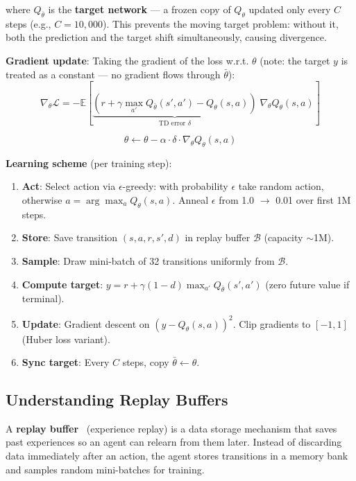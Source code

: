 where $Q_{\bar{\theta}}$ is the \textbf{target network} --- a frozen copy of $Q_\theta$ updated only every $C$ steps (e.g., $C = 10{,}000$). This prevents the moving target problem: without it, both the prediction and the target shift simultaneously, causing divergence.

\textbf{Gradient update}: Taking the gradient of the loss w.r.t. $\theta$ (note: the target $y$ is treated as a constant --- no gradient flows through $\bar{\theta}$): 
\begin{equation}
\nabla_\theta \mathcal{L} = -\mathbb{E}\!\left[\underbrace{\left(r + \gamma \max_{a'} Q_{\bar{\theta}}(s', a') - Q_\theta(s, a)\right)}_{\text{TD error } \delta}\; \nabla_\theta Q_\theta(s, a)\right]
\end{equation}
 
\begin{equation}
\theta \leftarrow \theta - \alpha \cdot \delta \cdot \nabla_\theta Q_\theta(s, a)
\end{equation}

\textbf{Learning scheme} (per training step):

\begin{enumerate}
  \item \textbf{Act}: Select action via $\epsilon$-greedy: with probability $\epsilon$ take random action, otherwise $a = \arg\max_a Q_\theta(s, a)$. Anneal $\epsilon$ from 1.0 $\rightarrow$ 0.01 over first 1M steps.
  \item \textbf{Store}: Save transition $(s, a, r, s', d)$ in replay buffer $\mathcal{B}$ (capacity $\sim$1M).
  \item \textbf{Sample}: Draw mini-batch of 32 transitions uniformly from $\mathcal{B}$.
  \item \textbf{Compute target}: $y = r + \gamma(1 - d)\max_{a'} Q_{\bar{\theta}}(s', a')$ (zero future value if terminal).
  \item \textbf{Update}: Gradient descent on $(y - Q_\theta(s,a))^2$. Clip gradients to $[-1, 1]$ (Huber loss variant).
  \item \textbf{Sync target}: Every $C$ steps, copy $\bar{\theta} \leftarrow \theta$.
\end{enumerate}

\subsection{Understanding Replay Buffers}
\label{understanding-replay-buffers}

A \textbf{replay buffer}~\cite{lin1992self} (experience replay) is a data storage mechanism that saves past experiences so an agent can relearn from them later. Instead of discarding data immediately after an action, the agent stores transitions in a memory bank and samples random mini-batches for training.

